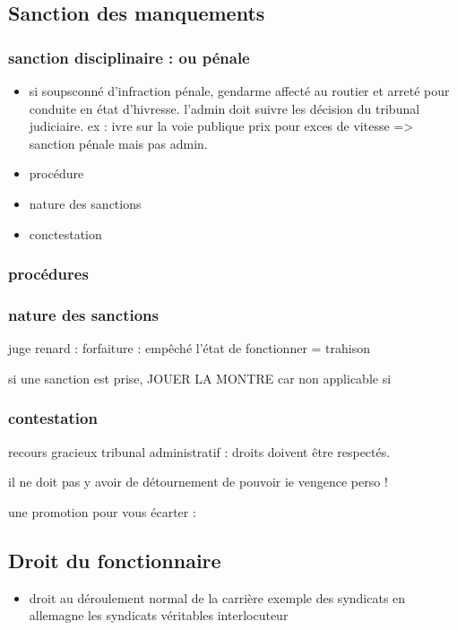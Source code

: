 \documentclass[a4paper,12pt]{article}
\begin{document}
\subsection{Sanction des manquements}
\subsubsection{sanction disciplinaire : ou pénale}

\begin{itemize}
	\item 
	si soupsconné d'infraction pénale, gendarme affecté au routier et arreté pour conduite
	en état d'hivresse. l'admin doit suivre les décision du tribunal judiciaire.
	ex : ivre sur la voie publique
	prix pour exces de vitesse => sanction pénale mais pas admin. 
	
	\item procédure
	
	\item  nature des sanctions
	
	\item conctestation 
\end{itemize}

\subsubsection{procédures}
\subsubsection{nature des sanctions}

juge renard : forfaiture : empêché l'état de fonctionner = trahison

si une sanction est prise, JOUER LA MONTRE car non applicable si 
\subsubsection{contestation}
recours gracieux
tribunal administratif : 
droits doivent être respectés.

il ne doit pas y avoir de détournement de pouvoir ie vengence perso !

une promotion pour vous écarter :

\subsection{Droit du fonctionnaire}

\begin{itemize}
	\item droit au déroulement normal de la carrière
	exemple des syndicats en allemagne
	les syndicats véritables interlocuteur
\end{itemize}
\end{document}
